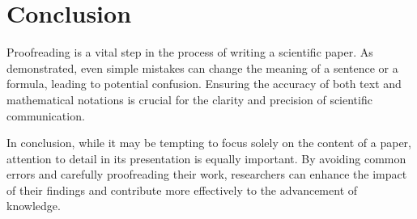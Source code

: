 \documentclass{article}
\begin{document}
\section{Conclusion}
Proofreading is a vital step in the process of writing a scientific paper. As demonstrated, even simple mistakes can change the meaning of a sentence or a formula, leading to potential confusion. Ensuring the accuracy of both text and mathematical notations is crucial for the clarity and precision of scientific communication.

In conclusion, while it may be tempting to focus solely on the content of a paper, attention to detail in its presentation is equally important. By avoiding common errors and carefully proofreading their work, researchers can enhance the impact of their findings and contribute more effectively to the advancement of knowledge.
\end{document}
